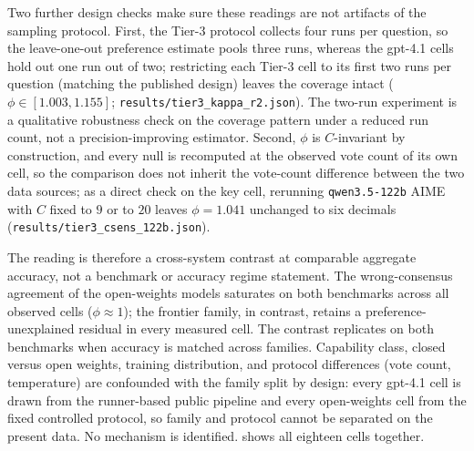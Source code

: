 \documentclass{article}
\begin{document}
Two further design checks make sure these readings are not artifacts
of the sampling protocol. First, the Tier-3 protocol collects four runs
per question, so the leave-one-out preference estimate pools three runs,
whereas the gpt-4.1 cells hold out one run out of two; restricting each
Tier-3 cell to its first two runs per question (matching the published
design) leaves the coverage intact
($\phi\in[1.003,1.155]$;
\texttt{results/tier3\_kappa\_r2.json}). The two-run
experiment is a qualitative robustness check on the coverage pattern
under a reduced run count, not a precision-improving estimator. Second,
$\phi$ is $C$-invariant by construction, and every null is recomputed at
the observed vote count of its own cell, so the comparison does not
inherit the vote-count difference between the two data sources; as a
direct check on the key cell, rerunning \texttt{qwen3.5-122b} AIME
with $C$ fixed to $9$ or to $20$ leaves $\phi=1.041$ unchanged to six
decimals (\texttt{results/tier3\_csens\_122b.json}).

The reading is therefore a cross-system
contrast at comparable aggregate accuracy, not a benchmark or accuracy
regime statement. The
wrong-consensus agreement of the open-weights models saturates
on both benchmarks across all observed cells
($\phi\approx1$); the frontier family, in contrast, retains a
preference-unexplained residual in every measured cell. The contrast
replicates on both benchmarks when accuracy is matched across families.
Capability class, closed versus open weights, training distribution, and
protocol differences (vote count, temperature) are confounded
with the family split by design: every gpt-4.1 cell is drawn from the
runner-based public pipeline and every open-weights cell from the fixed
controlled protocol, so family and protocol cannot be separated on the
present data. No
mechanism is identified.
 shows all eighteen cells together.
\end{document}
